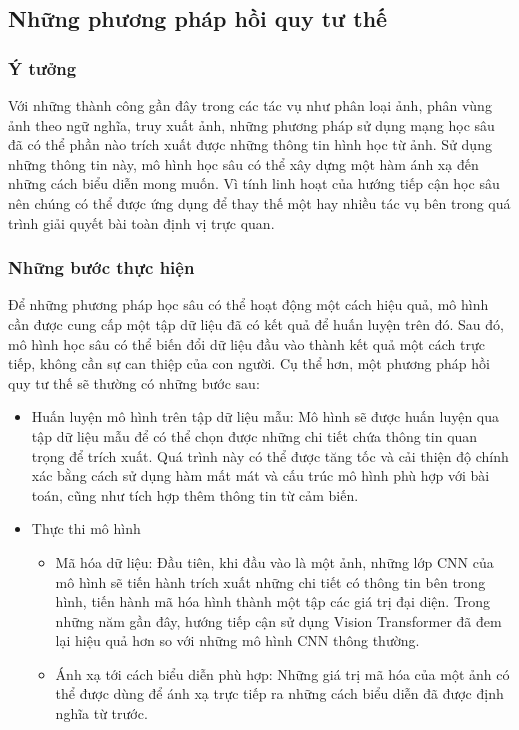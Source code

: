 \subsection{Những phương pháp hồi quy tư thế}
\subsubsection*{Ý tưởng}
Với những thành công gần đây trong các tác vụ như phân loại ảnh, phân vùng ảnh theo ngữ nghĩa, truy xuất ảnh, những phương pháp sử dụng mạng học sâu đã có thể phần nào trích xuất được những thông tin hình học từ ảnh. Sử dụng những thông tin này, mô hình học sâu có thể xây dựng một hàm ánh xạ đến những cách biểu diễn mong muốn. Vì tính linh hoạt của hướng tiếp cận học sâu nên chúng có thể được ứng dụng để thay thế một hay nhiều tác vụ bên trong quá trình giải quyết bài toàn định vị trực quan.

\newpage
\subsubsection*{Những bước thực hiện}

Để những phương pháp học sâu có thể hoạt động một cách hiệu quả, mô hình cần được cung cấp một tập dữ liệu đã có kết quả để huấn luyện trên đó. Sau đó, mô hình học sâu có thể biến đổi dữ liệu đầu vào thành kết quả một cách trực tiếp, không cần sự can thiệp của con người. Cụ thể hơn, một phương pháp hồi quy tư thế sẽ thường có những bước sau:
\begin{itemize}
    \item Huấn luyện mô hình trên tập dữ liệu mẫu: Mô hình sẽ được huấn luyện qua tập dữ liệu mẫu để có thể chọn được những chi tiết chứa thông tin quan trọng để trích xuất. Quá trình này có thể được tăng tốc và cải thiện độ chính xác bằng cách sử dụng hàm mất mát và cấu trúc mô hình phù hợp với bài toán, cũng như tích hợp thêm thông tin từ cảm biến.
    \item Thực thi mô hình
          \begin{itemize}
              \item Mã hóa dữ liệu: Đầu tiên, khi đầu vào là một ảnh, những lớp CNN của mô hình sẽ tiến hành trích xuất những chi tiết có thông tin bên trong hình, tiến hành mã hóa hình thành một tập các giá trị đại diện. Trong những năm gần đây, hướng tiếp cận sử dụng Vision Transformer đã đem lại hiệu quả hơn so với những mô hình CNN thông thường.
              \item Ánh xạ tới cách biểu diễn phù hợp: Những giá trị mã hóa của một ảnh có thể được dùng để ánh xạ trực tiếp ra những cách biểu diễn đã được định nghĩa từ trước.
          \end{itemize}
\end{itemize}

